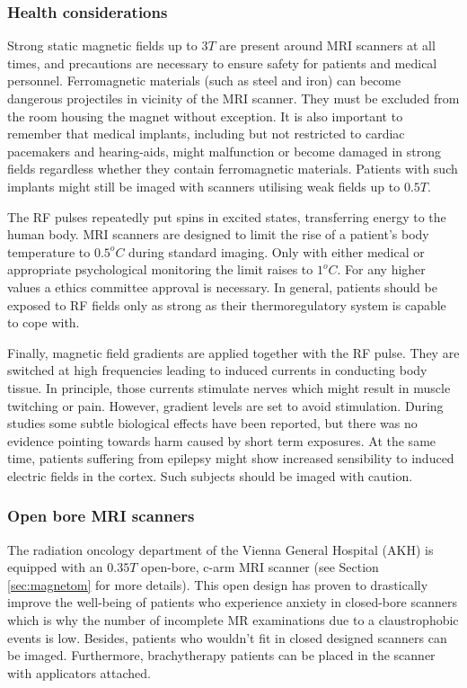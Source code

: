 

\subsubsection{Health considerations}

Strong static magnetic fields up to $3T$ are present around MRI scanners at all times, and precautions are necessary to ensure safety for patients and medical personnel.
Ferromagnetic materials (such as steel and iron) can become dangerous projectiles in vicinity of the MRI scanner.
They must be excluded from the room housing the magnet without exception.
It is also important to remember that medical implants, including but not restricted to cardiac pacemakers and hearing-aids, might malfunction or become damaged in strong fields regardless whether they contain ferromagnetic materials.
Patients with such implants might still be imaged with scanners utilising weak fields up to $0.5T$.

The RF pulses repeatedly put spins in excited states, transferring energy to the human body. MRI scanners are designed to limit the rise of a patient's body temperature to $0.5^oC$ during standard imaging. Only with either medical or appropriate psychological monitoring the limit raises to $1^oC$. For any higher values a ethics committee approval is necessary.
In general, patients should be exposed to RF fields only as strong as their thermoregulatory system is capable to cope with.

Finally, magnetic field gradients are applied together with the RF pulse.
They are switched at high frequencies leading to induced currents in conducting body tissue.
In principle, those currents stimulate nerves which might result in muscle twitching or pain.
However, gradient levels are set to avoid stimulation.
During studies some subtle biological effects have been reported, but there was no evidence pointing towards harm caused by short term exposures.
At the same time, patients suffering from epilepsy might show increased sensibility to induced electric fields in the cortex.
Such subjects should be imaged with caution. \cite{Maidment2014}


\subsubsection{Open bore MRI scanners}
The radiation oncology department of the Vienna General Hospital (AKH) is equipped with an $0.35  T$ open-bore, c-arm MRI scanner (see Section \ref{sec:magnetom} for more details).
This open design has proven to drastically improve the well-being of patients who experience anxiety in closed-bore scanners which is why the number of incomplete MR examinations due to a claustrophobic events is low. \cite{Enders2011a, Bangard2007}
Besides, patients who wouldn't fit in closed designed scanners can be imaged.
Furthermore, brachytherapy patients can be placed in the scanner with applicators attached.

